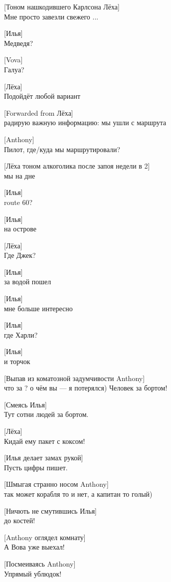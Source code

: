 [Тоном нашкодившего Карлсона Лёха]\\
Мне просто завезли свежего ...


[Илья]\\
Медведя?


[Vova]\\
Галуа?


[Лёха]\\
Подойдёт любой вариант


[Forwarded from Лёха]\\
радирую важную информацию: мы ушли с маршрута


[Anthony]\\
Пилот, где/куда мы маршрутировали?


[Лёха тоном алкоголика после запоя недели в 2]\\
мы на дне


[Илья]\\
route 60?


[Илья]\\
на острове


[Лёха]\\
Где Джек?


[Илья]\\
за водой пошел


[Илья]\\
мне больше интересно


[Илья]\\
где Харли?


[Илья]\\
и торчок


[Выпав из коматозной задумчивости Anthony]\\
что за ? о чём вы --- я потерялся) Человек за бортом!


[Смеясь Илья]\\
Тут сотни людей за бортом.


[Лёха]\\
Кидай ему пакет с коксом!


[Илья делает замах рукой]\\
Пусть цифры пишет.


[Шмыгая странно носом Anthony]\\
так может корабля то и нет, а капитан то голый)


[Ничють не смутившись Илья]\\
до костей!


[Anthony оглядел комнату]\\
А Вова уже выехал!


[Посмеиваясь Anthony]\\
Упрямый ублюдок!


